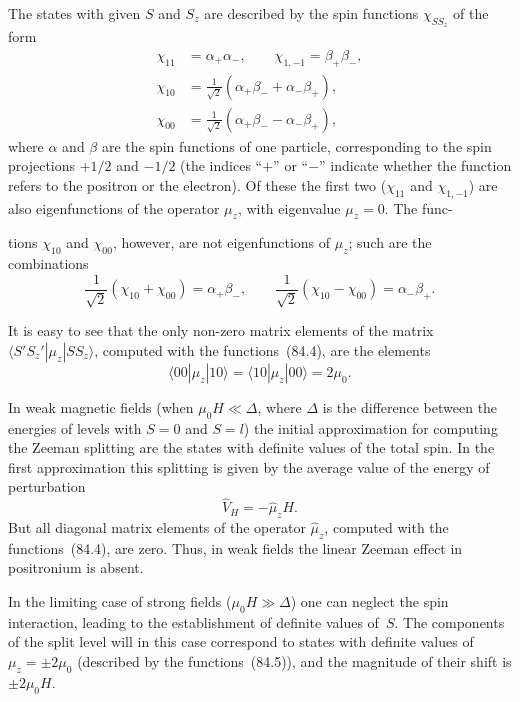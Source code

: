The states with given $S$ and $S_z$ are described by the spin functions $\chi_{SS_z}$ of the form
\begin{equation}
\begin{split}
\chi_{11} &= \alpha_+\alpha_-,\qquad\chi_{1,-1} = \beta_+\beta_-,\\
\chi_{10} &= \frac{1}{\sqrt{2}}(\alpha_+\beta_- + \alpha_-\beta_+),\\
\chi_{00} &= \frac{1}{\sqrt{2}}(\alpha_+\beta_- - \alpha_-\beta_+),
\end{split}
\tag{84.4}
\end{equation}
where $\alpha$ and $\beta$ are the spin functions of one particle, corresponding to the spin projections $+1/2$ and $-1/2$ (the indices ``$+$'' or ``$-$'' indicate whether the function refers to the positron or the electron). Of these the first two ($\chi_{11}$ and $\chi_{1,-1}$) are also eigenfunctions of the operator $\mu_z$, with eigenvalue $\mu_z = 0$. The func-

tions $\chi_{10}$ and $\chi_{00}$, however, are not eigenfunctions of $\mu_z$; such are the combinations
\[
\frac{1}{\sqrt{2}}(\chi_{10}+\chi_{00}) = \alpha_+\beta_-,\qquad \frac{1}{\sqrt{2}}(\chi_{10}-\chi_{00}) = \alpha_-\beta_+.
\]

It is easy to see that the only non-zero matrix elements of the matrix $\langle S'S_z'|\mu_z|SS_z\rangle$, computed with the functions~(84.4), are the elements
\begin{equation}
\langle 00|\mu_z|10\rangle = \langle 10|\mu_z|00\rangle = 2\mu_0.
\tag{84.6}
\end{equation}

In weak magnetic fields (when $\mu_0 H \ll \Delta$, where $\Delta$ is the difference between the energies of levels with $S = 0$ and $S = l$) the initial approximation for computing the Zeeman splitting are the states with definite values of the total spin. In the first approximation this splitting is given by the average value of the energy of perturbation
\[
\hat{V}_H = -\hat{\mu}_z H.
\]
But all diagonal matrix elements of the operator $\hat{\mu}_z$, computed with the functions~(84.4), are zero. Thus, in weak fields the linear Zeeman effect in positronium is absent.

In the limiting case of strong fields ($\mu_0 H \gg \Delta$) one can neglect the spin interaction, leading to the establishment of definite values of~$S$. The components of the split level will in this case correspond to states with definite values of $\mu_z = \pm 2\mu_0$ (described by the functions~(84.5)), and the magnitude of their shift is $\pm 2\mu_0 H$.

